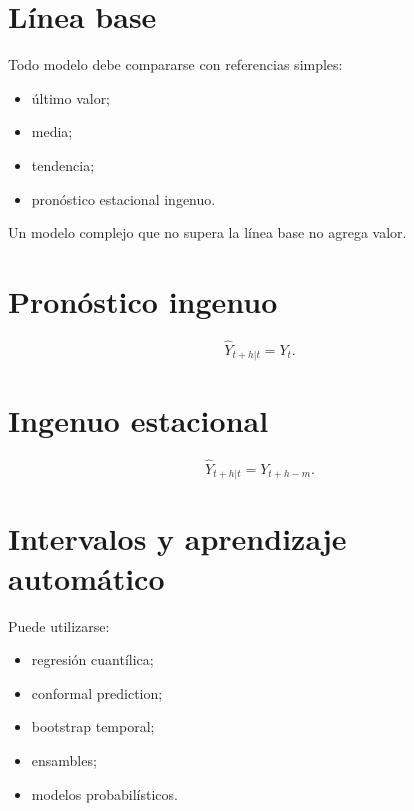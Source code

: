 \documentclass[
  spanish,
  10.5pt,
  letterpaper,
  DIV=11,
  numbers=noendperiod,
  oneside,
  open=any]{scrreprt}
\providecommand{\tightlist}{%
  \setlength{\itemsep}{0pt}\setlength{\parskip}{0pt}}
\theoremstyle{definition}
\theoremstyle{definition}
\theoremstyle{plain}
\theoremstyle{remark}
\begin{document}
\section*{Línea base}\label{luxednea-base}


Todo modelo debe compararse con referencias simples:

\begin{itemize}
\tightlist
\item
  último valor;
\item
  media;
\item
  tendencia;
\item
  pronóstico estacional ingenuo.
\end{itemize}

Un modelo complejo que no supera la línea base no agrega valor.

\section*{Pronóstico ingenuo}\label{pronuxf3stico-ingenuo}


\[
\widehat{Y}_{t+h|t}=Y_t.
\]

\section*{Ingenuo estacional}\label{ingenuo-estacional}


\[
\widehat{Y}_{t+h|t}=Y_{t+h-m}.
\]

\section*{Intervalos y aprendizaje
automático}\label{intervalos-y-aprendizaje-automuxe1tico}


Puede utilizarse:

\begin{itemize}
\tightlist
\item
  regresión cuantílica;
\item
  conformal prediction;
\item
  bootstrap temporal;
\item
  ensambles;
\item
  modelos probabilísticos.
\end{itemize}
\end{document}
